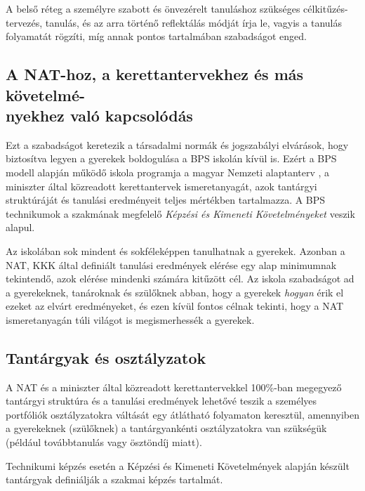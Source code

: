 A belső réteg a személyre szabott és önvezérelt tanuláshoz szükséges
célkitűzés-tervezés, tanulás, és az arra történő reflektálás módját írja
le, vagyis a tanulás folyamatát rögzíti, míg annak pontos tartalmában
szabadságot enged.

\hypertarget{nat-hoz-a-kerettantervekhez-es-mas-kovetelmenyekhez-valo-kapcsolodas}{%
\subsection{A NAT-hoz, a kerettantervekhez és más követelmé-\\
nyekhez való
kapcsolódás}\label{nat-hoz-a-kerettantervekhez-es-mas-kovetelmenyekhez-valo-kapcsolodas}}

Ezt a szabadságot keretezik a társadalmi normák és jogszabályi
elvárások, hogy biztosítva legyen a gyerekek boldogulása a BPS iskolán
kívül is. Ezért a BPS modell alapján működő iskola programja a magyar
Nemzeti alaptanterv {\autocite{Nat2020}}, a miniszter által közreadott
kerettantervek {\autocite{Kerettanterv2020}} ismeretanyagát, azok
tantárgyi struktúráját és tanulási eredményeit teljes mértékben
tartalmazza. A BPS technikumok a szakmának megfelelő \emph{Képzési és
Kimeneti Követelményeket} veszik alapul.

Az iskolában sok mindent és sokféleképpen tanulhatnak a gyerekek. Azonban
a NAT, KKK által definiált tanulási eredmények elérése egy alap
minimumnak tekintendő, azok elérése mindenki számára kitűzött cél. Az
iskola szabadságot ad a gyerekeknek, tanároknak és szülőknek abban,\break
hogy
a gyerekek \emph{hogyan} érik el ezeket az elvárt eredményeket, és ezen
kívül fontos célnak tekinti, hogy a NAT ismeretanyagán túli világot is
megismerhessék a gyerekek.

\hypertarget{tantargyak-es-osztalyzatok}{%
\subsection{Tantárgyak és
osztályzatok}\label{tantargyak-es-osztalyzatok}}

A NAT és a miniszter által közreadott kerettantervekkel 100\%-ban
megegyező tantárgyi struktúra és a tanulási eredmények lehetővé teszik a
személyes portfóliók osztályzatokra váltását egy átlátható folyamaton
keresztül, amennyiben a gyerekeknek (szülőknek) a tantárgyankénti
osztályzatokra van szükségük (például továbbtanulás vagy ösztöndíj
miatt).

Technikumi képzés esetén a Képzési és Kimeneti Követelmények alapján
készült tantárgyak definiálják a szakmai képzés tartalmát.

